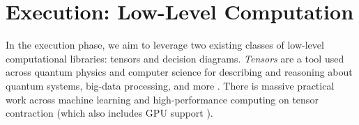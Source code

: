 \section{Execution: Low-Level Computation}
In the execution phase, we aim to leverage two existing classes of low-level computational libraries: tensors and decision diagrams. 
\emph{Tensors} are a tool used across quantum physics and computer science for describing and reasoning about quantum systems, big-data processing, and more \cite{BB17,Cichocki14,Orus19}. 
There is massive practical work across machine learning and high-performance computing on tensor contraction \cite{BK07,Hirata03,KKCLA17,VZTGDMVAC18} (which also includes GPU support \cite{KSTKPPRS19,NRBHHJN15}).





